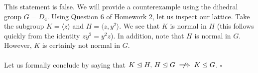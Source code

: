 \documentclass[letterpaper]{article}
\newcommand*{\QED}{\hfill\ensuremath{\square}}%
\begin{document}
This statement is false.
We will provide a counterexample using the dihedral group $ G = D_4 $.
Using Question 6 of Homework 2, let us inspect our lattice.
Take the subgroup $ K = \langle z \rangle $ and $ H = \langle z, y^2 \rangle $.
We see that $ K $ is normal in $ H $ (this follows quickly from the identity $ zy^2 = y^2 z $).
In addition, note that $ H $ is normal in $ G $.
However, $ K $ is certainly not normal in $ G $.
\\ \\
Let us formally conclude by saying that $ K \trianglelefteq H, \, H \trianglelefteq G \centernot\implies K \trianglelefteq G $.
\QED{}


\section{}
\label{sec:Question10}
\end{document}
